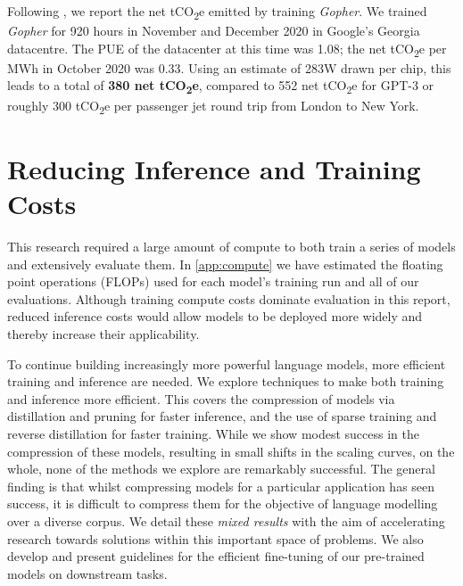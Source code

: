 \documentclass[11pt, a4paper, logo, internal, copyright, nonumbering]{deepmind}
\newcommand{\gopher}{\textit{Gopher}\xspace}
\newcommand{\tcotwoe}{tCO\textsubscript{2}e\xspace}
\begin{document}
Following \citet{patterson2021carbon}, we report the net \tcotwoe emitted by training \gopher. We trained \gopher for 920 hours in November and December 2020 in Google's Georgia datacentre. The PUE of the datacenter at this time was 1.08; the net \tcotwoe per MWh in October 2020 was 0.33. Using an estimate of 283W drawn per chip, this leads to a total of \textbf{380 net \tcotwoe}, compared to 552 net \tcotwoe for GPT-3 \citep{patterson2021carbon} or roughly 300 \tcotwoe per passenger jet round trip from London to New York.

\section{Reducing Inference and Training Costs}
\label{app:training_and_inference}
This research required a large amount of compute to both train a series of models and extensively evaluate them. In \autoref{app:compute} we have estimated the floating point operations (FLOPs) used for each model's training run and all of our evaluations.
Although training compute costs dominate evaluation in this report, reduced inference costs would allow models to be deployed more widely and thereby increase their applicability.

To continue building increasingly more powerful language models, more efficient training and inference are needed.
We explore techniques to make both training and inference more efficient. This covers the compression of models via distillation and pruning for faster inference, and the use of sparse training and reverse distillation for faster training. While we show modest success in the compression of these models, resulting in small shifts in the scaling curves, on the whole, none of the methods we explore are remarkably successful. The general finding is that whilst compressing models for a particular application has seen success, it is difficult to compress them for the objective of language modelling over a diverse corpus. We detail these \textit{mixed results} with the aim of accelerating research towards solutions within this important space of problems.
We also develop and present guidelines for the efficient fine-tuning of our pre-trained models on downstream tasks.
\end{document}
